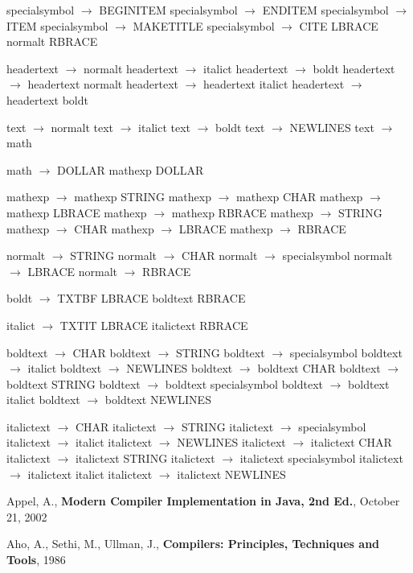 \documentclass{article}
\begin{document}
specialsymbol $\rightarrow$ BEGINITEM
specialsymbol $\rightarrow$ ENDITEM
specialsymbol $\rightarrow$ ITEM
specialsymbol $\rightarrow$ MAKETITLE
specialsymbol $\rightarrow$ CITE LBRACE normalt RBRACE

headertext $\rightarrow$ normalt
headertext $\rightarrow$ italict
headertext $\rightarrow$ boldt
headertext $\rightarrow$ headertext normalt
headertext $\rightarrow$ headertext italict
headertext $\rightarrow$ headertext boldt

text $\rightarrow$ normalt
text $\rightarrow$ italict
text $\rightarrow$ boldt
text $\rightarrow$ NEWLINES
text $\rightarrow$ math

math $\rightarrow$ DOLLAR mathexp DOLLAR

mathexp $\rightarrow$ mathexp STRING
mathexp $\rightarrow$ mathexp CHAR
mathexp $\rightarrow$ mathexp LBRACE
mathexp $\rightarrow$ mathexp RBRACE
mathexp $\rightarrow$ STRING
mathexp $\rightarrow$ CHAR
mathexp $\rightarrow$ LBRACE
mathexp $\rightarrow$ RBRACE

normalt $\rightarrow$ STRING
normalt $\rightarrow$ CHAR
normalt $\rightarrow$ specialsymbol
normalt $\rightarrow$ LBRACE
normalt $\rightarrow$ RBRACE

boldt $\rightarrow$ TXTBF LBRACE boldtext RBRACE

italict $\rightarrow$ TXTIT LBRACE italictext RBRACE

boldtext $\rightarrow$ CHAR
boldtext $\rightarrow$ STRING
boldtext $\rightarrow$ specialsymbol
boldtext $\rightarrow$ italict
boldtext $\rightarrow$ NEWLINES
boldtext $\rightarrow$ boldtext CHAR
boldtext $\rightarrow$ boldtext STRING
boldtext $\rightarrow$ boldtext specialsymbol
boldtext $\rightarrow$ boldtext italict
boldtext $\rightarrow$ boldtext NEWLINES

italictext $\rightarrow$ CHAR
italictext $\rightarrow$ STRING
italictext $\rightarrow$ specialsymbol
italictext $\rightarrow$ italict
italictext $\rightarrow$ NEWLINES
italictext $\rightarrow$ italictext CHAR
italictext $\rightarrow$ italictext STRING
italictext $\rightarrow$ italictext specialsymbol
italictext $\rightarrow$ italictext italict
italictext $\rightarrow$ italictext NEWLINES


\begin{thebibliography}

 Appel, A., \textbf{Modern Compiler Implementation in Java, 2nd Ed.}, October 21, 2002

 Aho, A., Sethi, M., Ullman, J., \textbf{Compilers: Principles, Techniques and Tools}, 1986

\end{thebibliography}
\end{document}
